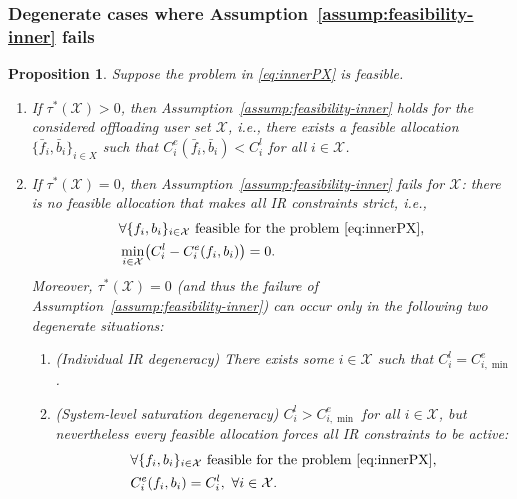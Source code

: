 \documentclass[lettersize,journal]{IEEEtran}
\newtheorem{proposition}{Proposition}
\newcommand{\ie}{\emph{i.e.}}
\begin{document}
\subsubsection{Degenerate cases where Assumption~\ref{assump:feasibility-inner} fails}
\begin{proposition}
\label{prop:assump1_degenerate}
Suppose the problem in \eqref{eq:innerPX} is feasible.

\begin{enumerate}
\item If $\tau^*(\mathcal{X})>0$, then Assumption~\ref{assump:feasibility-inner} holds for the considered offloading user set $\mathcal{X}$, \ie, there exists a feasible allocation $\{\bar f_i,\bar b_i\}_{i\in X}$ such that
$C_i^e(\bar f_i,\bar b_i) < C_i^l$ for all $i\in \mathcal{X}$.

\item If $\tau^*(\mathcal{X})=0$, then Assumption~\ref{assump:feasibility-inner} fails for $\mathcal{X}$: there is \emph{no} feasible allocation that makes \emph{all} IR constraints strict, i.e.,
\begin{equation}
\begin{aligned}
\label{eq:no_strict_IR}
&\forall \{f_i,b_i\}_{i\in \mathcal{X}}\ \text{feasible for the problem \eqref{eq:innerPX}},\\ 
&\min_{i\in \mathcal{X}}\bigl(C_i^l - C_i^e(f_i,b_i)\bigr)=0.
\end{aligned}
\end{equation}
Moreover, $\tau^*(\mathcal{X})=0$ (and thus the failure of Assumption~\ref{assump:feasibility-inner}) can occur only in the following two degenerate situations:
\begin{enumerate}
\item[\textbf{(D1)}] (\emph{Individual IR degeneracy}) There exists some $i\in \mathcal{X}$ such that $C_i^l=C_{i,\min}^e$.
\item[\textbf{(D2)}] (\emph{System-level saturation degeneracy}) $C_i^l>C_{i,\min}^e$ for all $i\in \mathcal{X}$, but nevertheless every feasible allocation forces \emph{all} IR constraints to be active:
\begin{equation}
\begin{aligned}
\label{eq:all_IR_active}
&\forall \{f_i,b_i\}_{i\in \mathcal{X}}\ \text{feasible for the problem \eqref{eq:innerPX}},\\  
&C_i^e(f_i,b_i)=C_i^l,\ \forall i\in \mathcal{X}.
\end{aligned}
\end{equation}
\end{enumerate}
\end{enumerate}
\end{proposition}
\end{document}
